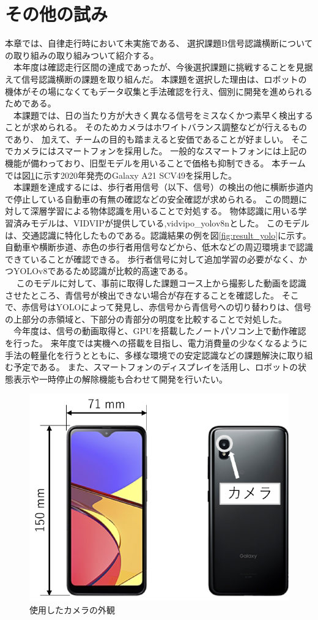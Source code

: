 \documentclass[twocolumn,9pt]{jsproceedings}
\begin{document}
\section{その他の試み}
本章では、自律走行時において未実施である、
選択課題B信号認識横断についての取り組みの取り組みついて紹介する。
\\　本年度は確認走行区間の達成であったが、今後選択課題に挑戦することを見据えて信号認識横断の課題を取り組んだ。
本課題を選択した理由は、ロボットの機体がその場になくてもデータ収集と手法確認を行え、個別に開発を進められるためである。
\\　本課題では、日の当たり方が大きく異なる信号をミスなくかつ素早く検出することが求められる。
そのためカメラはホワイトバランス調整などが行えるものであり、
加えて、チームの目的も踏まえると安価であることが好ましい。
そこでカメラにはスマートフォンを採用した。
一般的なスマートフォンには上記の機能が備わっており、旧型モデルを用いることで価格も抑制できる。
本チームでは図\ref{fig:smartphone}に示す2020年発売のGalaxy A21 SCV49を採用した。
\\　本課題を達成するには、歩行者用信号（以下、信号）の検出の他に横断歩道内で停止している自動車の有無の確認などの安全確認が求められる。
この問題に対して深層学習による物体認識を用いることで対処する。
物体認識に用いる学習済みモデルは、VIDVIP\cite{BabaVIDVIP}が提供している,vidvipo\_yolov8nとした。
このモデルは、交通認識に特化したものである。認識結果の例を図\ref{fig:result_yolo}に示す。
自動車や横断歩道、赤色の歩行者用信号などから、低木などの周辺環境まで認識できていることが確認できる。
歩行者信号に対して追加学習の必要がなく、かつYOLOv8であるため認識が比較的高速である。
\\　
このモデルに対して、事前に取得した課題コース上から撮影した動画を認識させたところ、青信号が検出できない場合が存在することを確認した。
そこで、赤信号はYOLOによって発見し、赤信号から青信号への切り替わりは、信号の上部分の赤領域と、下部分の青部分の明度を比較することで対処した。
\\　今年度は、信号の動画取得と、GPUを搭載したノートパソコン上で動作確認を行った。
来年度では実機への搭載を目指し、電力消費量の少なくなるように手法の軽量化を行うとともに、多様な環境での安定認識などの課題解決に取り組む予定である。
また、スマートフォンのディスプレイを活用し、ロボットの状態表示や一時停止の解除機能も合わせて開発を行いたい。

\begin{figure}[h]
  \begin{center}
    \includegraphics[width=0.6\linewidth]{figs/smartphone.pdf}
    \caption{使用したカメラの外観}
    \label{fig:smartphone}
  \end{center}
\end{figure}
\end{document}
